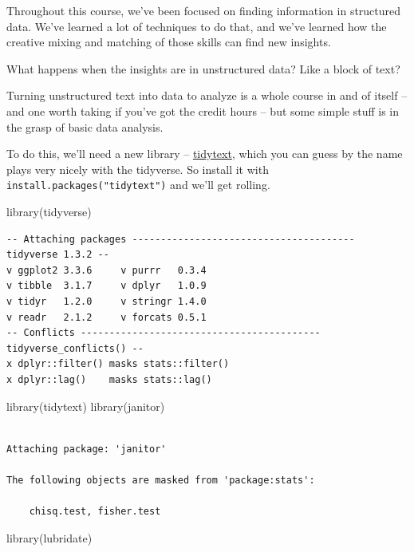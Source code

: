 \documentclass[
  letterpaper,
  DIV=11,
  numbers=noendperiod]{scrreprt}
\newenvironment{Shaded}{\begin{snugshade}}{\end{snugshade}}
\newcommand{\FunctionTok}[1]{\textcolor[rgb]{0.28,0.35,0.67}{#1}}
\newcommand{\NormalTok}[1]{\textcolor[rgb]{0.00,0.23,0.31}{#1}}
\begin{document}
Throughout this course, we've been focused on finding information in
structured data. We've learned a lot of techniques to do that, and we've
learned how the creative mixing and matching of those skills can find
new insights.

What happens when the insights are in unstructured data? Like a block of
text?

Turning unstructured text into data to analyze is a whole course in and
of itself -- and one worth taking if you've got the credit hours -- but
some simple stuff is in the grasp of basic data analysis.

To do this, we'll need a new library --
\href{https://cran.r-project.org/web/packages/tidytext/vignettes/tidytext.html}{tidytext},
which you can guess by the name plays very nicely with the tidyverse. So
install it with \texttt{install.packages("tidytext")} and we'll get
rolling.

\begin{Shaded}
\begin{Highlighting}[]
\FunctionTok{library}\NormalTok{(tidyverse)}
\end{Highlighting}
\end{Shaded}

\begin{verbatim}
-- Attaching packages --------------------------------------- tidyverse 1.3.2 --
v ggplot2 3.3.6     v purrr   0.3.4
v tibble  3.1.7     v dplyr   1.0.9
v tidyr   1.2.0     v stringr 1.4.0
v readr   2.1.2     v forcats 0.5.1
-- Conflicts ------------------------------------------ tidyverse_conflicts() --
x dplyr::filter() masks stats::filter()
x dplyr::lag()    masks stats::lag()
\end{verbatim}

\begin{Shaded}
\begin{Highlighting}[]
\FunctionTok{library}\NormalTok{(tidytext)}
\FunctionTok{library}\NormalTok{(janitor)}
\end{Highlighting}
\end{Shaded}

\begin{verbatim}

Attaching package: 'janitor'

The following objects are masked from 'package:stats':

    chisq.test, fisher.test
\end{verbatim}

\begin{Shaded}
\begin{Highlighting}[]
\FunctionTok{library}\NormalTok{(lubridate)}
\end{Highlighting}
\end{Shaded}
\end{document}
